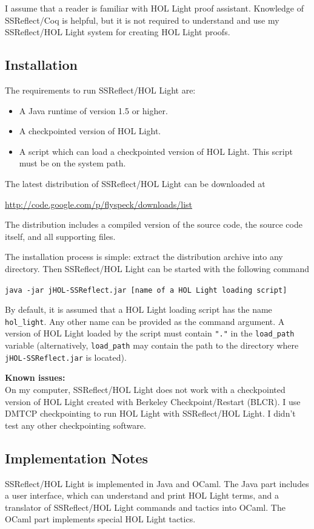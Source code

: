 \documentclass[a4paper]{article}
\newcommand{\issues}{{\bf Known issues:}\\}
\begin{document}
I assume that a reader is familiar with HOL Light proof assistant. Knowledge of SSReflect/Coq is helpful, but it is not required to understand and use my SSReflect/HOL Light system for creating HOL Light proofs.

\subsection{Installation}
The requirements to run SSReflect/HOL Light are:
\begin{itemize}
\item A Java runtime of version 1.5 or higher.
\item A checkpointed version of HOL Light.
\item A script which can load a checkpointed version of HOL Light. This script must be on the system path.
\end{itemize}

The latest distribution of SSReflect/HOL Light can be downloaded at

\url{http://code.google.com/p/flyspeck/downloads/list}

The distribution includes a compiled version of the source code, the source code itself, and all supporting files.

The installation process is simple: extract the distribution archive into any directory. Then SSReflect/HOL Light can be started with the following command

\verb|java -jar jHOL-SSReflect.jar [name of a HOL Light loading script]|

By default, it is assumed that a HOL Light loading script has the name \verb|hol_light|. Any other name can be provided as the command argument. A version of HOL Light loaded by the script must contain \verb|"."| in the \verb|load_path| variable (alternatively, \verb|load_path| may contain the path to the directory where {\tt jHOL-SSReflect.jar} is located).

\issues
On my computer, SSReflect/HOL Light does not work with a checkpointed version of HOL Light created with Berkeley Checkpoint/Restart (BLCR). I use DMTCP checkpointing to run HOL Light with SSReflect/HOL Light. I didn't test any other checkpointing software.


\subsection{Implementation Notes}
SSReflect/HOL Light is implemented in Java and OCaml. The Java part includes a user interface, which can understand and print HOL Light terms, and a translator of SSReflect/HOL Light commands and tactics into OCaml. The OCaml part implements special HOL Light tactics.
\end{document}
